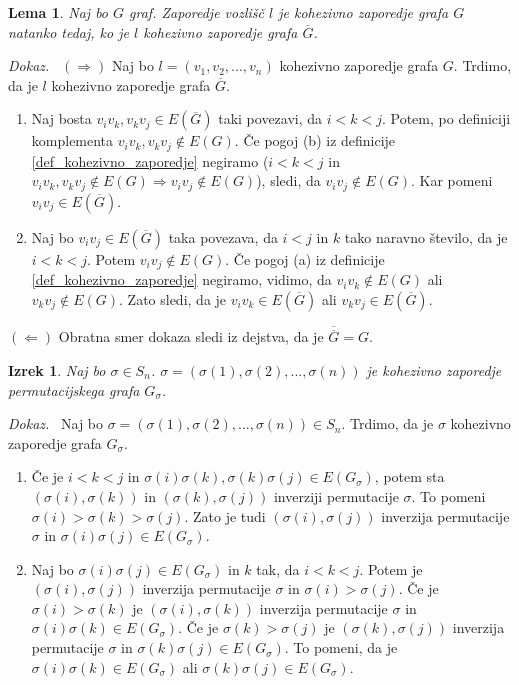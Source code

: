 \documentclass[a4paper, 12pt]{book}
\newtheorem{lema}{Lema}[chapter]
\newtheorem{izrek}{Izrek}[chapter]
\newenvironment{dokaz}{\emph{Dokaz.}\ }{\hspace{\fill}{$\Box$}}
\begin{document}
\begin{lema}
\label{lema0}
    Naj bo $G$ graf. Zaporedje vozlišč $l$ je kohezivno zaporedje grafa $G$ natanko tedaj, ko je $l$ kohezivno zaporedje grafa $\overline{G}$. 
\end{lema}
\begin{dokaz}
    $(\Rightarrow)$ Naj bo $l = (v_1, v_2, ..., v_n)$ kohezivno zaporedje grafa $G$. Trdimo, da je $l$ kohezivno zaporedje grafa $\overline{G}$. 
    \begin{enumerate}[label=(\alph*)]
        \item Naj bosta $v_iv_k, v_kv_j \in E(\overline{G})$ taki povezavi, da $i < k < j$. Potem, po definiciji komplementa $v_iv_k, v_kv_j \notin E(G)$. Če pogoj (b) iz definicije \ref{def_kohezivno_zaporedje} negiramo ($i < k < j$ in $v_iv_k, v_kv_j \notin E(G) \Rightarrow v_iv_j \notin E(G)$), sledi, da $v_iv_j \notin E(G)$. Kar pomeni $v_iv_j \in E(\overline{G})$.
        \item Naj bo $v_iv_j \in E(\overline{G})$ taka povezava, da $i < j$ in $k$ tako naravno število, da je $i < k < j$. Potem $v_iv_j \notin E(G)$. Če pogoj (a) iz definicije \ref{def_kohezivno_zaporedje} negiramo, vidimo, da $v_iv_k \notin E(G)$ ali $v_kv_j \notin E(G)$. Zato sledi, da je $v_iv_k \in E(\overline{G})$ ali $v_kv_j \in E(\overline{G})$. 
    \end{enumerate}

    $(\Leftarrow)$ Obratna smer dokaza sledi iz dejstva, da je $\overline{\overline{G}} = G$.
\end{dokaz}

\begin{izrek}
\label{izrek_sigma_kohezivno_zaporedje}
    Naj bo $\sigma \in S_n$. $\sigma = (\sigma(1), \sigma(2), ..., \sigma(n))$ je kohezivno zaporedje permutacijskega grafa $G_{\sigma}$.
\end{izrek}
\begin{dokaz}
    Naj bo $\sigma = (\sigma(1), \sigma(2), ..., \sigma(n)) \in S_n$. Trdimo, da je $\sigma$ kohezivno zaporedje grafa $G_{\sigma}$. 
    \begin{enumerate}[label=(\alph*)]
        \item Če je $i < k < j$ in $\sigma(i)\sigma(k), \sigma(k)\sigma(j) \in E(G_{\sigma})$, potem sta $(\sigma(i),\sigma(k))$ in $(\sigma(k),\sigma(j))$ inverziji permutacije $\sigma$. To pomeni $\sigma(i) > \sigma(k) > \sigma(j)$. Zato je tudi $(\sigma(i),\sigma(j))$ inverzija permutacije $\sigma$ in $\sigma(i)\sigma(j) \in E(G_{\sigma})$.        

        \item Naj bo $\sigma(i)\sigma(j) \in E(G_{\sigma})$ in $k$ tak, da $i < k < j$. Potem je $(\sigma(i),\sigma(j))$ inverzija permutacije $\sigma$ in $\sigma(i) > \sigma(j)$. Če je $\sigma(i) > \sigma(k)$ je $(\sigma(i),\sigma(k))$ inverzija permutacije $\sigma$ in $\sigma(i)\sigma(k) \in E(G_{\sigma})$. Če je $\sigma(k) > \sigma(j)$ je $(\sigma(k), \sigma(j))$ inverzija permutacije $\sigma$ in $\sigma(k)\sigma(j) \in E(G_{\sigma})$. To pomeni, da je 
        $\sigma(i)\sigma(k) \in E(G_{\sigma})$ ali $\sigma(k)\sigma(j) \in E(G_{\sigma})$.
    \end{enumerate}
\end{dokaz}
\end{document}
